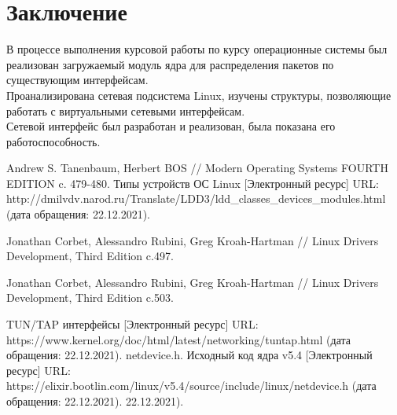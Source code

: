 \documentclass[14pt, a4paper]{extarticle}
\begin{document}
\section*{Заключение}
В процессе выполнения курсовой работы по курсу операционные системы был реализован загружаемый модуль ядра для распределения пакетов по существующим интерфейсам. \\
\indent Проанализирована сетевая подсистема Linux, изучены структуры, позволяющие работать с виртуальными сетевыми интерфейсам. \\
\indent Сетевой интерфейс был разработан и реализован, была показана его работоспособность.
\clearpage
\begin{thebibliography}{9}
	 Andrew S. Tanenbaum,
Herbert BOS //  Modern Operating Systems FOURTH EDITION c. 479-480.
	 Типы устройств ОС Linux [Электронный ресурс] URL: http://dmilvdv.narod.ru/Translate/LDD3/ldd\_classes\_devices\_modules.html (дата обращения: 22.12.2021).
	
	 Jonathan Corbet, Alessandro Rubini, Greg Kroah-Hartman // Linux Drivers Development, Third Edition c.497.
	
	 Jonathan Corbet, Alessandro Rubini, Greg Kroah-Hartman // Linux Drivers Development, Third Edition c.503.
	
	 TUN/TAP интерфейсы [Электронный ресурс] URL: https://www.kernel.org/doc/html/latest/networking/tuntap.html (дата обращения: 22.12.2021).
	 netdevice.h. Исходный код ядра v5.4 [Электронный ресурс] URL: https://elixir.bootlin.com/linux/v5.4/source/include/linux/netdevice.h (дата обращения: 22.12.2021). 22.12.2021).
\end{thebibliography}

\clearpage
\end{document}
